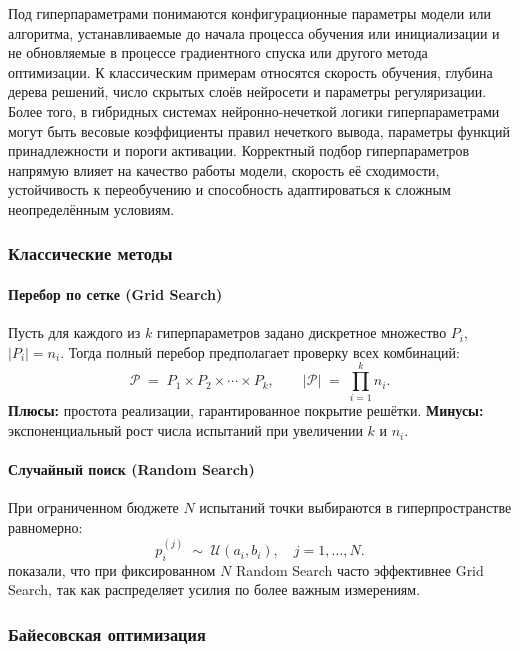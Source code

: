 \begin{center}
Под гиперпараметрами понимаются конфигурационные параметры модели или алгоритма, устанавливаемые до начала процесса обучения или инициализации и не обновляемые в процессе градиентного спуска или другого метода оптимизации. К классическим примерам относятся скорость обучения, глубина дерева решений, число скрытых слоёв нейросети и параметры регуляризации. Более того, в гибридных системах нейронно-нечеткой логики гиперпараметрами могут быть весовые коэффициенты правил нечеткого вывода, параметры функций принадлежности и пороги активации. Корректный подбор гиперпараметров напрямую влияет на качество работы модели, скорость её сходимости, устойчивость к переобучению и способность адаптироваться к сложным неопределённым условиям.

\subsubsection{Классические методы}

\paragraph{Перебор по сетке (Grid Search)}  
Пусть для каждого из \(k\) гиперпараметров задано дискретное множество \(P_i\), \(|P_i|=n_i\). Тогда полный перебор предполагает проверку всех комбинаций:
\begin{equation}
\mathcal{P} \;=\; P_1 \times P_2 \times \cdots \times P_k,
\qquad
|\mathcal{P}| \;=\; \prod_{i=1}^k n_i.
\label{eq:grid-search-size}
\end{equation}
\textbf{Плюсы:} простота реализации, гарантированное покрытие решётки.  
\textbf{Минусы:} экспоненциальный рост числа испытаний при увеличении \(k\) и \(n_i\).

\paragraph{Случайный поиск (Random Search)}  
При ограниченном бюджете \(N\) испытаний точки выбираются в гиперпространстве равномерно:
\begin{equation}
p_i^{(j)} \;\sim\; \mathcal{U}(a_i, b_i),
\quad j = 1,\dots,N.
\label{eq:random-search}
\end{equation}
\citet{bergstra2012random} показали, что при фиксированном \(N\) Random Search часто эффективнее Grid Search, так как распределяет усилия по более важным измерениям.

\subsubsection{Байесовская оптимизация}


\end{center}
